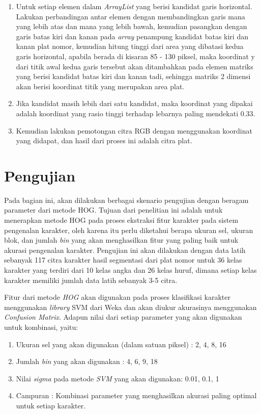 \begin{enumerate}
	\item Untuk setiap elemen dalam \textit{ArrayList} yang berisi kandidat garis horizontal. Lakukan perbandingan antar elemen dengan membandingkan garis mana yang lebih atas dan mana yang lebih bawah, kemudian pasangkan dengan garis batas kiri dan kanan pada \textit{array} penampung kandidat batas kiri dan kanan plat nomor, kemudian hitung tinggi dari area yang dibatasi kedua garis horizontal, apabila berada di kisaran 85 - 130 piksel, maka koordinat y dari titik awal kedua garis tersebut akan ditambahkan pada elemen matriks yang berisi kandidat batas kiri dan kanan tadi, sehingga matriks 2 dimensi akan berisi koordinat titik yang merupakan area plat.
	\item Jika kandidat masih lebih dari satu kandidat, maka koordinat yang dipakai adalah koordinat yang rasio tinggi terhadap lebarnya paling mendekati 0.33.
	\item Kemudian lakukan pemotongan citra RGB dengan menggunakan koordinat yang didapat, dan hasil dari proses ini adalah citra plat.\\
\end{enumerate}

\section{Pengujian}
\noindent Pada bagian ini, akan dilakukan berbagai skenario pengujian dengan beragam parameter dari metode HOG. Tujuan dari penelitian ini adalah untuk menerapkan metode HOG pada proses ekstraksi fitur karakter pada sistem pengenalan karakter, oleh karena itu perlu diketahui berapa ukuran sel, ukuran blok, dan jumlah \textit{bin} yang akan menghasilkan fitur yang paling baik untuk akurasi pengenalan karakter. Pengujian ini akan dilakukan dengan data latih sebanyak 117 citra karakter hasil segmentasi dari plat nomor untuk 36 kelas karakter yang terdiri dari 10 kelas angka dan 26 kelas huruf, dimana setiap kelas karakter memiliki jumlah data latih sebanyak 3-5 citra.

\noindent Fitur dari metode \textit{HOG} akan digunakan pada proses klasifikasi karakter menggunakan \textit{library} SVM dari Weka dan akan diukur akurasinya menggunakan \textit{Confusion Matrix}. Adapun nilai dari setiap parameter yang akan digunakan untuk kombinasi, yaitu:
\begin{enumerate}
	\item Ukuran sel yang akan digunakan (dalam satuan piksel) : 2, 4, 8, 16
	\item Jumlah \textit{bin} yang akan digunakan : 4, 6, 9, 18
	\item Nilai \textit{sigma} pada metode \textit{SVM} yang akan digunakan: 0.01, 0.1, 1
	\item Campuran : Kombinasi parameter yang menghasilkan akurasi paling optimal untuk setiap karakter.\\
\end{enumerate}

